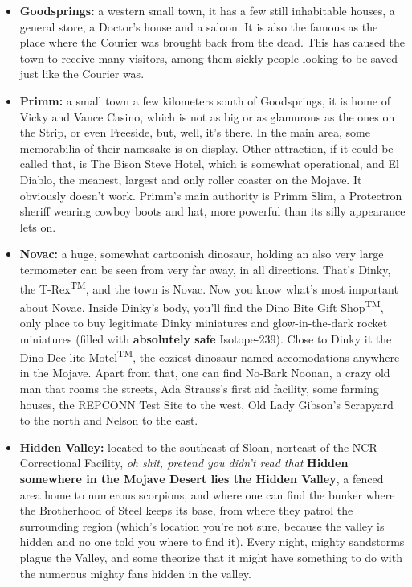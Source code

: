 \begin{itemize}
\item \textbf{Goodsprings:} a western small town, it has a few still inhabitable houses, a general store, a Doctor's house and a saloon. It is also the famous as the place where the Courier was brought back from the dead. This has caused the town to receive many visitors, among them sickly people looking to be saved just like the Courier was.

\item \textbf{Primm:} a small town a few kilometers south of Goodsprings, it is home of Vicky and Vance Casino, which is not as big or as glamurous as the ones on the Strip, or even Freeside, but, well, it's there. In the main area, some memorabilia of their namesake is on display. Other attraction, if it could be called that, is The Bison Steve Hotel, which is somewhat operational, and El Diablo, the meanest, largest and only roller coaster on the Mojave. It obviously doesn't work. Primm's main authority is Primm Slim, a Protectron sheriff wearing cowboy boots and hat, more powerful than its silly appearance lets on.

\item \textbf{Novac:} a huge, somewhat cartoonish dinosaur, holding an also very large termometer can be seen from very far away, in all directions. That's Dinky, the T-Rex\textsuperscript{TM\textregistered}, and the town is Novac. Now you know what's most important about Novac. Inside Dinky's body, you'll find the Dino Bite Gift Shop\textsuperscript{TM\textregistered}, only place to buy legitimate Dinky miniatures and glow-in-the-dark rocket miniatures (filled with \textbf{absolutely safe} Isotope-239). Close to Dinky it the Dino Dee-lite Motel\textsuperscript{TM\textregistered}, the coziest dinosaur-named accomodations anywhere in the Mojave. Apart from that, one can find No-Bark Noonan, a crazy old man that roams the streets, Ada Strauss's first aid facility, some farming houses, the REPCONN Test Site to the west, Old Lady Gibson's Scrapyard to the north and Nelson to the east. 

\item \textbf{Hidden Valley:} located to the southeast of Sloan, norteast of the NCR Correctional Facility, \textit{oh shit, pretend you didn't read that} \textbf{Hidden somewhere in the Mojave Desert lies the Hidden Valley}, a fenced area home to numerous scorpions, and where one can find the bunker where the Brotherhood of Steel keeps its base, from where they patrol the surrounding region (which's location you're not sure, because the valley is hidden and no one told you where to find it). Every night, mighty sandstorms plague the Valley, and some theorize that it might have something to do with the numerous mighty fans hidden in the valley.


\end{itemize}

